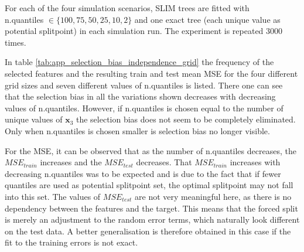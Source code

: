 For each of the four simulation scenarios, SLIM trees are fitted  with  \\ n.quantiles $\in \{100, 75, 50, 25, 10, 2\}$ and one exact tree (each unique value as potential splitpoint) in each simulation run. The experiment is repeated 3000 times.

In table \ref{tab:app_selection_bias_independence_grid} the frequency of the selected features and the resulting train and test mean MSE for the four different grid sizes and seven different values of n.quantiles is listed. There one can see that the selection bias in all the variations shown decreases with decreasing values of n.quantiles. However, if n.quantiles is chosen equal to the number of unique values of $\textbf{x}_3$ the selection bias does not seem to be completely eliminated. Only when n.quantiles is chosen smaller is selection bias no longer visible.

For the MSE, it can be observed that as the number of n.quantiles decreases, the $MSE_{train}$ increases and the $MSE_{test}$ decreases. 
That $MSE_{train}$ increases with decreasing n.quantiles was to be expected and is due to the fact that if fewer quantiles are used as potential splitpoint set, the optimal splitpoint may not fall into this set. 
The values of $MSE_{test}$ are not very meaningful here, as there is no dependency between the features and the target. This means that the forced split is merely an adjustment to the random error terms, which naturally look different on the test data. A better generalisation is therefore obtained in this case if the fit to the training errors is not exact. 

